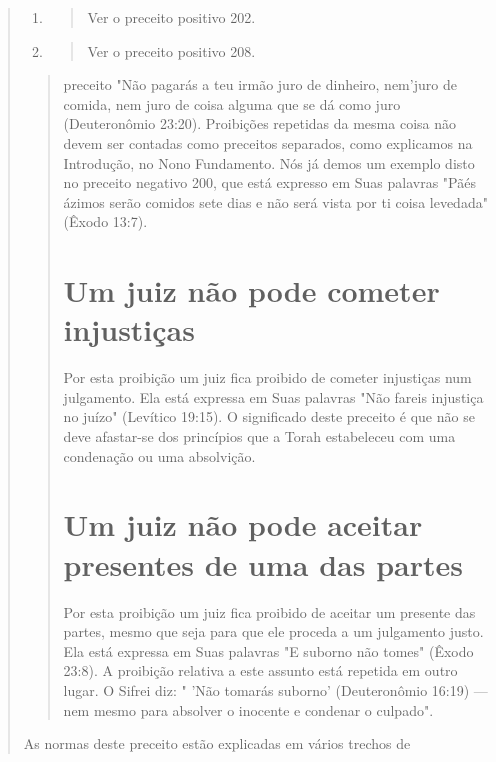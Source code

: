 \begin{quote}
\begin{enumerate}
\def\labelenumi{\arabic{enumi}.}
\setcounter{enumi}{411}
\item
 \begin{quote}
 Ver o preceito positivo 202.
 \end{quote}
\item
 \begin{quote}
 Ver o preceito positivo 208.
 \end{quote}
\end{enumerate}

\begin{quote}

preceito "Não pagarás a teu irmão juro de dinheiro, nem'juro de comida,
nem juro de coisa alguma que se dá como juro (Deuteronômio 23:20).
Proibições repetidas da mesma coisa não devem ser contadas como
preceitos separados, como explicamos na Introdução, no Nono Fundamento.
Nós já demos um exem­plo disto no preceito negativo 200, que está
expresso em Suas palavras "Pãés ázimos serão comidos sete dias e não
será vista por ti coisa levedada" (Êxodo 13:7).

\section{Um juiz não pode cometer injustiças}

Por esta proibição um juiz fica proibido de cometer injustiças num
julgamento. Ela está expressa em Suas palavras "Não fareis injustiça no
juízo" (Levítico 19:15). O significado deste preceito é que não se deve
afastar-se dos princípios que a Torah estabeleceu com uma condenação ou
uma absolvição.

\section{Um juiz não pode aceitar presentes de uma das partes}

Por esta proibição um juiz fica proibido de aceitar um presente das
partes, mesmo que seja para que ele proceda a um julgamento justo. Ela
está expressa em Suas palavras "E suborno não tomes" (Êxodo 23:8). A
proibição relativa a este assunto está repetida em outro lugar. O Sifrei
diz: " 'Não tomarás suborno' (Deuteronômio 16:19) --- nem mesmo para
absolver o inocente e con­denar o culpado".
\end{quote}

As normas deste preceito estão explicadas em vários trechos de


\end{quote}
